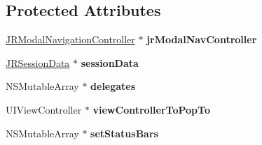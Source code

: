 \subsection*{Protected Attributes}
\begin{DoxyCompactItemize}
\item 
\hypertarget{interface_j_r_user_interface_maestro_a1b639f26d4eccec35dec1ec8a19b3fc7}{
\hyperlink{interface_j_r_modal_navigation_controller}{JRModalNavigationController} $\ast$ {\bfseries jrModalNavController}}
\label{interface_j_r_user_interface_maestro_a1b639f26d4eccec35dec1ec8a19b3fc7}

\item 
\hypertarget{interface_j_r_user_interface_maestro_adaa3408162f9b1ce8d88d033d53b2500}{
\hyperlink{interface_j_r_session_data}{JRSessionData} $\ast$ {\bfseries sessionData}}
\label{interface_j_r_user_interface_maestro_adaa3408162f9b1ce8d88d033d53b2500}

\item 
\hypertarget{interface_j_r_user_interface_maestro_aaf4f2ea5a74a6c175d5a7c62ba8ef3cf}{
NSMutableArray $\ast$ {\bfseries delegates}}
\label{interface_j_r_user_interface_maestro_aaf4f2ea5a74a6c175d5a7c62ba8ef3cf}

\item 
\hypertarget{interface_j_r_user_interface_maestro_aa7375c7bff5e4033399e05bbe75db716}{
UIViewController $\ast$ {\bfseries viewControllerToPopTo}}
\label{interface_j_r_user_interface_maestro_aa7375c7bff5e4033399e05bbe75db716}

\item 
\hypertarget{interface_j_r_user_interface_maestro_a7efb1b0ab1e8702c569eed3cc177046b}{
NSMutableArray $\ast$ {\bfseries setStatusBars}}
\label{interface_j_r_user_interface_maestro_a7efb1b0ab1e8702c569eed3cc177046b}

\end{DoxyCompactItemize}
